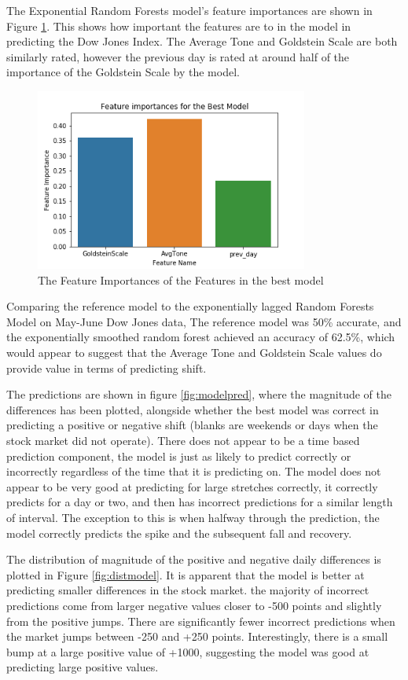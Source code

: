 The Exponential Random Forests model's feature importances are shown in Figure \ref{fig:featimport}. This shows how important the features are to in the model in predicting the Dow Jones Index. The Average Tone and Goldstein Scale are both similarly rated, however the previous day is rated at around half of the importance of the Goldstein Scale by the model.
\begin{figure}[H]
	\centering
	\includegraphics[width=0.8\textwidth]{images/feature_importance.png}
	\caption{The Feature Importances of the Features in the best model}
	\label{fig:featimport}
\end{figure}


Comparing the reference model to the exponentially lagged Random Forests Model on May-June Dow Jones data, The reference model was 50\% accurate, and the exponentially smoothed random forest achieved an accuracy of 62.5\%, which would appear to suggest that the Average Tone and Goldstein Scale values do provide value in terms of predicting shift. 

The predictions are shown in figure \ref{fig:modelpred}, where the magnitude of the differences has been plotted, alongside whether the best model was correct in predicting a positive or negative shift (blanks are weekends or days when the stock market did not operate). There does not appear to be a time based prediction component, the model is just as likely to predict correctly or incorrectly regardless of the time that it is predicting on. The model does not appear to be very good at predicting for large stretches correctly, it correctly predicts for a day or two, and then has incorrect predictions for a similar length of interval. The exception to this is when halfway through the prediction, the model correctly predicts the spike and the subsequent fall and recovery. 

The distribution of magnitude of the positive and negative daily differences is plotted in Figure \ref{fig:distmodel}.  It is apparent that the model is better at predicting smaller differences in the stock market. the majority of incorrect predictions come from larger negative values closer to -500 points and slightly from the positive jumps. There are significantly fewer incorrect predictions when the market jumps between -250 and +250 points. Interestingly, there is a small bump at a large positive value of +1000, suggesting the model was good at predicting large positive values. 

